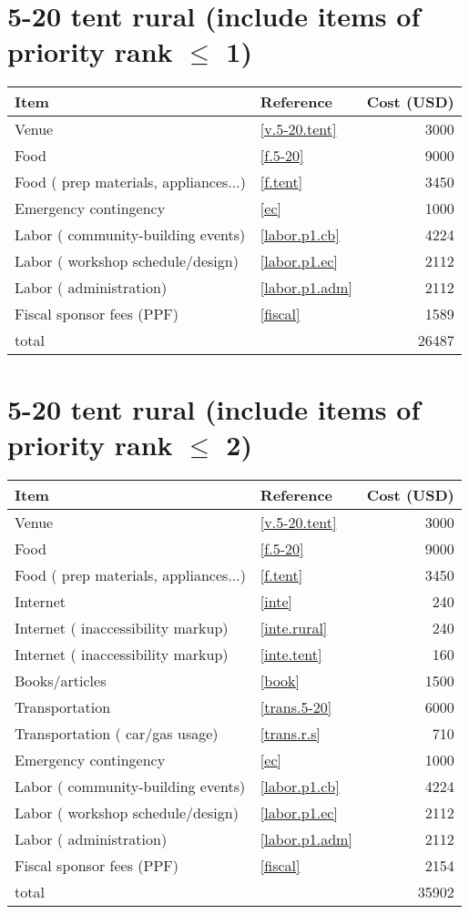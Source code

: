 \section*{5-20 tent rural (include items of priority rank $\leq$ 1)}
\begin{center}
\begin{tabular}{llr}
Item & Reference & Cost (USD) \\ \hline
Venue & \ref{v.5-20.tent} & 3000 \\
Food & \ref{f.5-20} & 9000 \\
Food ( prep materials, appliances...) & \ref{f.tent} & 3450 \\
Emergency contingency & \ref{ec} & 1000 \\
Labor ( community-building events) & \ref{labor.p1.cb} & 4224 \\
Labor ( workshop schedule/design) & \ref{labor.p1.ec} & 2112 \\
Labor ( administration) & \ref{labor.p1.adm} & 2112 \\
Fiscal sponsor fees (PPF) & \ref{fiscal} & 1589 \\ \hline
total &  & 26487
\end{tabular}
\end{center}
\newpage
\section*{5-20 tent rural (include items of priority rank $\leq$ 2)}
\begin{center}
\begin{tabular}{llr}
Item & Reference & Cost (USD) \\ \hline
Venue & \ref{v.5-20.tent} & 3000 \\
Food & \ref{f.5-20} & 9000 \\
Food ( prep materials, appliances...) & \ref{f.tent} & 3450 \\
Internet & \ref{inte} & 240 \\
Internet ( inaccessibility markup) & \ref{inte.rural} & 240 \\
Internet ( inaccessibility markup) & \ref{inte.tent} & 160 \\
Books/articles & \ref{book} & 1500 \\
Transportation & \ref{trans.5-20} & 6000 \\
Transportation ( car/gas usage) & \ref{trans.r.s} & 710 \\
Emergency contingency & \ref{ec} & 1000 \\
Labor ( community-building events) & \ref{labor.p1.cb} & 4224 \\
Labor ( workshop schedule/design) & \ref{labor.p1.ec} & 2112 \\
Labor ( administration) & \ref{labor.p1.adm} & 2112 \\
Fiscal sponsor fees (PPF) & \ref{fiscal} & 2154 \\ \hline
total &  & 35902
\end{tabular}
\end{center}
\newpage
